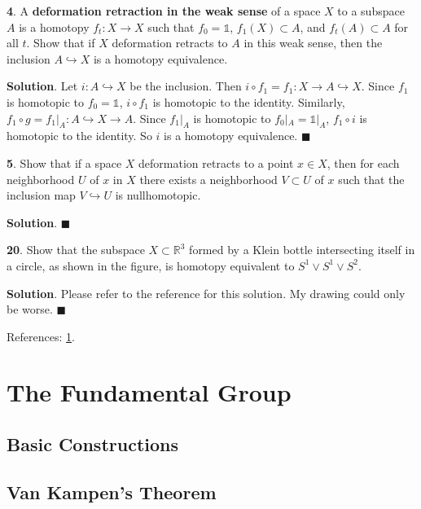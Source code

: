 \documentclass{article}
\newcommand{\R}{\mathbb{R}}
\newcommand{\identity}{\mathds{1}}
\begin{document}
\textbf{4}. A \textbf{deformation retraction in the weak sense} of a space $X$ to a subspace $A$ is a homotopy $f_{t}: X\to X$ such that $f_{0} = \identity$, $f_{1}(X)\subset A$, and $f_{t}(A)\subset A$ for all $t$. Show that if $X$ deformation retracts to $A$ in this weak sense, then the inclusion $A\hookrightarrow X$ is a homotopy equivalence.
\medskip

\textbf{Solution}. Let $i: A\hookrightarrow X$ be the inclusion. Then $i\circ f_{1} = f_{1}: X\to A\hookrightarrow X$. Since $f_{1}$ is homotopic to $f_{0} = \identity$, $i\circ f_{1}$ is homotopic to the identity. Similarly, $f_{1}\circ g = f_{1}|_{A}: A\hookrightarrow X\to A$. Since $f_{1}|_{A}$ is homotopic to $f_{0}|_{A} = \identity|_{A}$, $f_{1}\circ i$ is homotopic to the identity. So $i$ is a homotopy equivalence. $\blacksquare$
\bigskip
\bigskip

\textbf{5}. Show that if a space $X$ deformation retracts to a point $x\in X$, then for each neighborhood $U$ of $x$ in $X$ there exists a neighborhood $V\subset U$ of $x$ such that the inclusion map $V\hookrightarrow U$ is nullhomotopic.
\medskip

\textbf{Solution}. $\blacksquare$
\bigskip
\bigskip

\textbf{20}. Show that the subspace $X\subset \R^{3}$ formed by a Klein bottle intersecting itself in a circle, as shown in the figure, is homotopy equivalent to $S^{1}\vee S^{1}\vee S^{2}$.
\medskip

\textbf{Solution}. Please refer to the reference for this solution. My drawing could only be worse. $\blacksquare$
\medskip

References: \href{https://math.stackexchange.com/questions/366199/show-a-subspace-formed-by-a-klein-bottle-is-homotopy-equivalent-to-s1-vee-s1}{1}.
\bigskip
\bigskip
\newpage

\section{The Fundamental Group}

\subsection{Basic Constructions}

\subsection{Van Kampen's Theorem}
\end{document}
